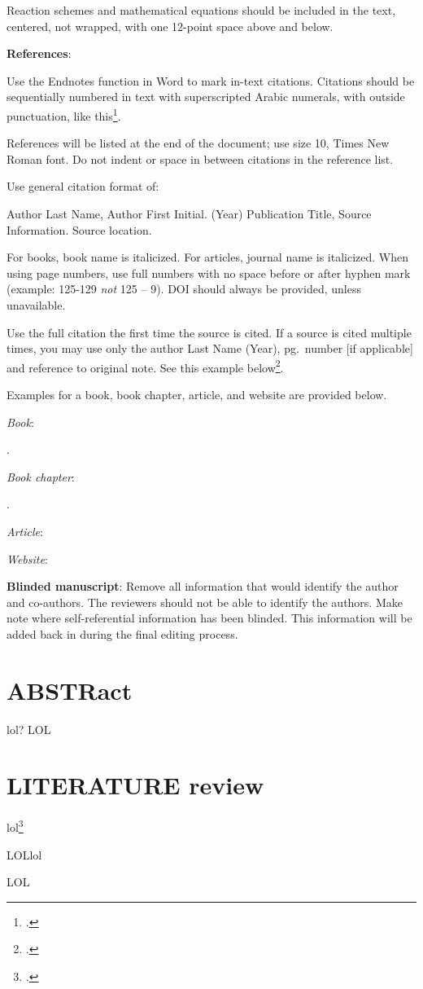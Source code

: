 \documentclass{ajss}
\begin{document}
Reaction schemes and mathematical equations should be included in the text, centered, not
wrapped, with one 12-point space above and below. 

\textbf{References}:

Use the Endnotes function in Word to mark in-text citations.
Citations should be sequentially numbered in text with superscripted Arabic numerals, with outside punctuation, like this\footcite{Snape2009}.

References will be listed at the end of the document; use size 10, Times New Roman font.
Do not indent or space in between citations in the reference list.

Use general citation format of:

Author Last Name, Author First Initial. (Year) Publication Title, Source Information. Source location.

For books, book name is italicized.
For articles, journal name is italicized.
When using page numbers, use full numbers with no space before or after hyphen mark (example: 125-129 \textit{not} 125 -- 9).
DOI should always be provided, unless unavailable.

Use the full citation the first time the source is cited.
If a source is cited multiple times, you may use only the author Last Name (Year), pg.\ number [if applicable] and reference to original note.
See this example below\footcite{Snape2009}.

Examples for a book, book chapter, article, and website are provided below.

\textit{Book}:

.

\textit{Book chapter}:

.

\textit{Article}:


\textit{Website}:


\href{www.lol.com}{\color{blue}{LOL}} 

\textbf{Blinded manuscript}:
Remove all information that would identify the author and co-authors. The reviewers should not be able to identify the authors. Make note where self-referential information has been blinded.
This information will be added back in during the final editing process.
\section*{ABSTRact}
lol? LOL

\section*{LITERATURE review}
lol\footcite{Snape2009}

\newpage

LOL\newline lol\par LOL

\theendnotes
\end{document}
